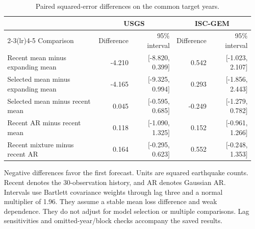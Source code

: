 \begin{table}[!htb]
\centering
\small
\caption{Paired squared-error differences on the common target years.}
\label{tab:contrasts}
\setlength{\tabcolsep}{4pt}
\begin{tabular}{lrrrr}
\toprule
 & \multicolumn{2}{c}{USGS} & \multicolumn{2}{c}{ISC-GEM} \\
\cmidrule(lr){2-3}\cmidrule(lr){4-5}
Comparison & Difference & 95\% interval & Difference & 95\% interval \\
\midrule
Recent mean minus expanding mean & -4.210 & [-8.820, 0.399] & 0.542 & [-1.023, 2.107] \\
Selected mean minus expanding mean & -4.165 & [-9.325, 0.994] & 0.293 & [-1.856, 2.443] \\
Selected mean minus recent mean & 0.045 & [-0.595, 0.685] & -0.249 & [-1.279, 0.782] \\
Recent AR minus recent mean & 0.118 & [-1.090, 1.325] & 0.152 & [-0.961, 1.266] \\
Recent mixture minus recent AR & 0.164 & [-0.295, 0.623] & 0.552 & [-0.248, 1.353] \\
\bottomrule
\end{tabular}
\par\smallskip
\begin{minipage}{\linewidth}\footnotesize
Negative differences favor the first forecast. Units are squared earthquake counts. Recent denotes the 30-observation history, and AR denotes Gaussian AR. Intervals use Bartlett covariance weights through lag three and a normal multiplier of 1.96. They assume a stable mean loss difference and weak dependence. They do not adjust for model selection or multiple comparisons. Lag sensitivities and omitted-year/block checks accompany the saved results.
\end{minipage}
\end{table}
